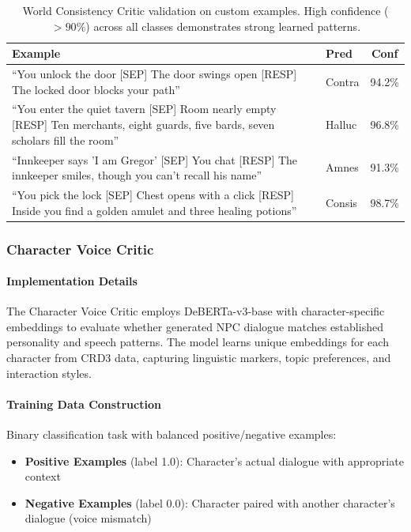 \documentclass[11pt]{article}
\begin{document}
\begin{table}[h]
\centering
\scriptsize
\begin{tabular}{p{7cm}lc}
\toprule
\textbf{Example} & \textbf{Pred} & \textbf{Conf} \\
\midrule
``You unlock the door [SEP] The door swings open [RESP] The locked door blocks your path'' & Contra & 94.2\% \\
\midrule
``You enter the quiet tavern [SEP] Room nearly empty [RESP] Ten merchants, eight guards, five bards, seven scholars fill the room'' & Halluc & 96.8\% \\
\midrule
``Innkeeper says 'I am Gregor' [SEP] You chat [RESP] The innkeeper smiles, though you can't recall his name'' & Amnes & 91.3\% \\
\midrule
``You pick the lock [SEP] Chest opens with a click [RESP] Inside you find a golden amulet and three healing potions'' & Consis & 98.7\% \\
\bottomrule
\end{tabular}
\caption{World Consistency Critic validation on custom examples. High confidence ($>90\%$) across all classes demonstrates strong learned patterns.}
\end{table}


\subsubsection{Character Voice Critic}

\paragraph{Implementation Details}
The Character Voice Critic employs DeBERTa-v3-base with character-specific embeddings to evaluate whether generated NPC dialogue matches established personality and speech patterns. The model learns unique embeddings for each character from CRD3 data, capturing linguistic markers, topic preferences, and interaction styles.

\paragraph{Training Data Construction}
Binary classification task with balanced positive/negative examples:
\begin{itemize}
    \item \textbf{Positive Examples} (label 1.0): Character's actual dialogue with appropriate context
    \item \textbf{Negative Examples} (label 0.0): Character paired with another character's dialogue (voice mismatch)
\end{itemize}
\end{document}
